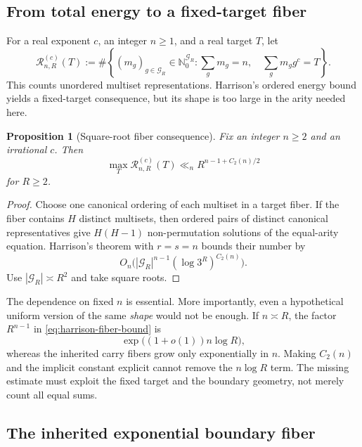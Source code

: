 \documentclass[11pt,oneside]{article}
\newtheorem{proposition}[theorem]{Proposition}
\theoremstyle{definition}
\theoremstyle{remark}
\newcommand{\Nzero}{\mathbb N_0}
\newcommand{\cG}{\mathcal G}
\newcommand{\cR}{\mathcal R}
\begin{document}
\subsection{From total energy to a fixed-target fiber}

For a real exponent $c$, an integer $n\ge1$, and a real target $T$, let
\begin{equation}
  \cR_{n,R}^{(c)}(T):=
  \#\left\{(m_g)_{g\in\cG_R}\in\Nzero^{\cG_R}:
  \sum_gm_g=n,\quad \sum_gm_gg^c=T\right\}.
  \label{eq:unordered-fiber}
\end{equation}
This counts unordered multiset representations.  Harrison's ordered energy bound yields a
fixed-target consequence, but its shape is too large in the arity needed here.

\begin{proposition}[Square-root fiber consequence]
\label{prop:harrison-fiber}
Fix an integer $n\ge2$ and an irrational $c$.  Then
\begin{equation}
  \max_T\cR_{n,R}^{(c)}(T)
  \ll_n R^{n-1+C_2(n)/2}
  \label{eq:harrison-fiber-bound}
\end{equation}
for $R\ge2$.
\end{proposition}

\begin{proof}
Choose one canonical ordering of each multiset in a target fiber.  If the fiber contains $H$
distinct multisets, then ordered pairs of distinct canonical representatives give
$H(H-1)$ non-permutation solutions of the equal-arity equation.  Harrison's theorem with
$r=s=n$ bounds their number by
\[
  O_n\bigl(|\cG_R|^{n-1}(\log3^R)^{C_2(n)}\bigr).
\]
Use $|\cG_R|\asymp R^2$ and take square roots.
\end{proof}

The dependence on fixed $n$ is essential.  More importantly, even a hypothetical uniform version
of the same \emph{shape} would not be enough.  If $n\asymp R$, the factor
$R^{n-1}$ in \eqref{eq:harrison-fiber-bound} is
\begin{equation}
  \exp\bigl((1+o(1))n\log R\bigr),
  \label{eq:energy-shape-wall}
\end{equation}
whereas the inherited carry fibers grow only exponentially in $n$.  Making $C_2(n)$ and the
implicit constant explicit cannot remove the $n\log R$ term.  The missing estimate must exploit
the fixed target and the boundary geometry, not merely count all equal sums.

\subsection{The inherited exponential boundary fiber}
\end{document}
